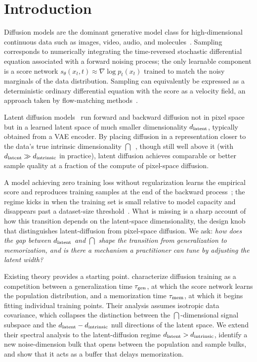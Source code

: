 \section{Introduction}
\label{sec:intro}

Diffusion models are the dominant generative model class for
high-dimensional continuous data such as images, video, audio, and
molecules~\citep{ho2020denoising, song2021scoresde,
rombach2022highresolution, karras2022elucidating,
leeGenMolDrugDiscovery2025}. Sampling corresponds to numerically
integrating the time-reversed stochastic differential equation
associated with a forward noising process; the only learnable
component is a score network
$s_\theta(x_t, t) \approx \nabla \log p_t(x_t)$ trained to match the
noisy marginals of the data distribution. Sampling can equivalently
be expressed as a deterministic ordinary differential equation with
the score as a velocity field, an approach taken by flow-matching
methods~\citep{lipman2023flow}.

Latent diffusion models~\citep{rombach2022highresolution, esser2024sd3,
podell2023sdxl} run forward and backward diffusion not in pixel space
but in a learned latent space of much smaller dimensionality $d_{\mathrm{latent}}$,
typically obtained from a VAE encoder. By placing diffusion in a
representation closer to the data's true intrinsic dimensionality
$\dint$~\citep{pope2021, brown2022manifold, stanczuk2024manifold,
kamkari2024geometric}, though still well above it (with
$d_{\mathrm{latent}} \gg d_{\mathrm{intrinsic}}$ in practice), latent diffusion achieves comparable
or better sample quality at a fraction of the compute of pixel-space
diffusion.

A model achieving zero training loss without regularization learns
the empirical score and reproduces training samples at the end of
the backward process~\citep{gu2023memorization}; the regime kicks
in when the training set is small relative to model capacity and
disappears past a dataset-size threshold~\citep{kadkhodaie2023learning}. What is missing is
a sharp account of how this transition depends on the latent-space
dimensionality, the design knob that distinguishes
latent-diffusion from pixel-space diffusion. We ask:
\emph{how does the gap between $d_{\mathrm{latent}}$ and $\dint$ shape the
transition from generalization to memorization, and is there a
mechanism a practitioner can tune by adjusting the latent width?}

Existing theory provides a starting point.
\citet{bonnaire2025} characterize diffusion training as a
competition between a generalization time $\tau_{\mathrm{gen}}$, at which the
score network learns the population distribution, and a
memorization time $\tau_{\mathrm{mem}}$, at which it begins fitting individual
training points. Their analysis assumes isotropic data covariance,
which collapses the distinction between the
$\dint$-dimensional signal subspace and the $d_{\mathrm{latent}} - d_{\mathrm{intrinsic}}$ null
directions of the latent space. We extend their spectral analysis
to the latent-diffusion regime $d_{\mathrm{latent}} > d_{\mathrm{intrinsic}}$, identify a new
noise-dimension bulk that opens between the population and sample
bulks, and show that it acts as a buffer that delays memorization.

